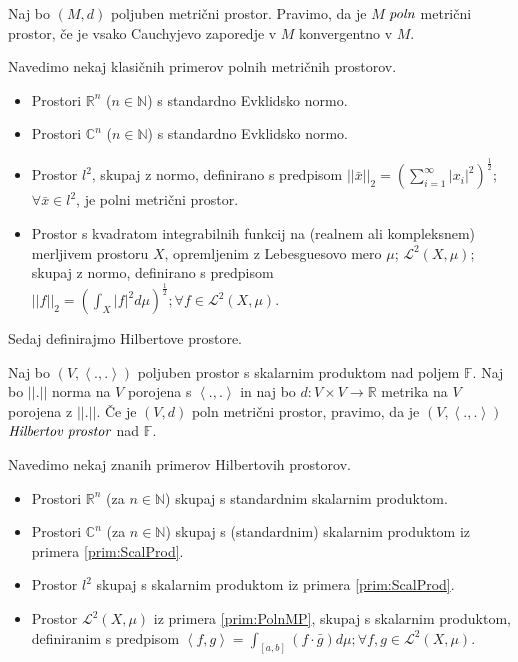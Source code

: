 \documentclass[mat2]{matdelo}
\newcommand{\R}{\mathbb{R}}
\newcommand{\F}{\mathbb{F}}
\newcommand{\N}{\mathbb{N}}
\newcommand{\C}{\mathbb{C}}
\newcommand{\abs}[1]{\ensuremath{\lvert #1 \rvert}}
\newcommand{\norm}[1]{\abs{\abs{#1}}}
\newcommand{\pojem}[1]{\ensuremath{\emph{#1}}}
\newcommand{\Sp}[2]{\ensuremath{\left<#1, #2\right>}}
\newcommand{\map}[3]{\ensuremath{{#1}:{#2}\rightarrow{#3}}}
\begin{document}
		\begin{definicija}
			\label{def:PolnMP}
			Naj bo $(M, d)$ poljuben metrični prostor. Pravimo, da je $M$ \pojem{poln} metrični prostor, če je vsako Cauchyjevo zaporedje v $M$ konvergentno v $M$.
		\end{definicija}
		
		\begin{primer}
			\label{prim:PolnMP}
			Navedimo nekaj klasičnih primerov polnih metričnih prostorov.
			\begin{itemize}
				\item Prostori $\R^n$ ($n\in\N$) s standardno Evklidsko normo.
				\item Prostori $\C^n$ ($n\in\N$) s standardno Evklidsko normo.
				\item Prostor $l^2$, skupaj z normo, definirano s predpisom $\norm{\bar{x}}_2= \left(\sum_{i=1}^{\infty}\abs{x_i}^2\right)^\frac{1}{2}$; $\forall \bar{x}\in l^2$, je polni metrični prostor.
				\item Prostor s kvadratom integrabilnih funkcij na (realnem ali kompleksnem) merljivem prostoru $X$, opremljenim z Lebesguesovo mero $\mu$; $\mathcal{L}^2(X, \mu)$; skupaj z normo, definirano s predpisom $\norm{f}_2= \left(\int_{X}\abs{f}^2d\mu\right)^\frac{1}{2};\forall f\in \mathcal{L}^2(X, \mu)$.
			\end{itemize}
		\end{primer}
		
		Sedaj definirajmo Hilbertove prostore.
		
		\begin{definicija}
			\label{def:Hilbert}
			Naj bo $(V, \Sp{.}{.})$ poljuben prostor s skalarnim produktom nad poljem $\F$. Naj bo $\norm{.}$ norma na $V$ porojena s $\Sp{.}{.}$ in naj bo $\map{d}{V\times V}{\R}$ metrika na $V$ porojena z $\norm{.}$. Če je $(V, d)$ poln metrični prostor, pravimo, da je $(V, \Sp{.}{.})$ \pojem{Hilbertov prostor} nad $\F$. 
		\end{definicija}
		
		\begin{primer}
			\label{prim:Hilbert}
			Navedimo nekaj znanih primerov Hilbertovih prostorov. \begin{itemize}
				\item Prostori $\R^n$ (za $n\in\N$) skupaj s standardnim skalarnim produktom.
				\item Prostori $\C^n$ (za $n\in\N$) skupaj s (standardnim) skalarnim produktom iz primera \ref{prim:ScalProd}.
				\item Prostor $l^2$ skupaj s skalarnim produktom iz primera \ref{prim:ScalProd}.
				\item Prostor $\mathcal{L}^2(X, \mu)$ iz primera \ref{prim:PolnMP}, skupaj s skalarnim produktom, definiranim s predpisom $\Sp{f}{g}= \int_{[a, b]}(f\cdot \bar{g}) d\mu;\forall f, g\in \mathcal{L}^2(X, \mu)$.
			\end{itemize}
		\end{primer}
		
\end{document}
